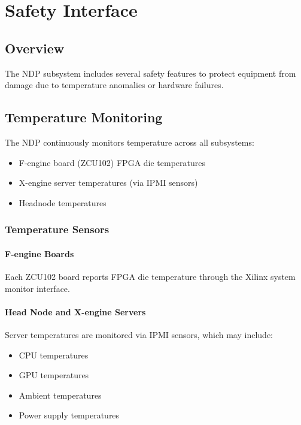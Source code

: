 
\chapter{Safety Interface}
\label{sec:safety}

\section{Overview}

The NDP subsystem includes several safety features to protect equipment from damage due to temperature anomalies or hardware failures.

\section{Temperature Monitoring}

The NDP continuously monitors temperature across all subsystems:
\begin{itemize}
    \item F-engine board (ZCU102) FPGA die temperatures
    \item X-engine server temperatures (via IPMI sensors)
    \item Headnode temperatures
\end{itemize}

\subsection{Temperature Sensors}

\subsubsection{F-engine Boards}

Each ZCU102 board reports FPGA die temperature through the Xilinx system monitor interface.

\subsubsection{Head Node and X-engine Servers}

Server temperatures are monitored via IPMI sensors, which may include:
\begin{itemize}
    \item CPU temperatures
    \item GPU temperatures
    \item Ambient temperatures
    \item Power supply temperatures
\end{itemize}

